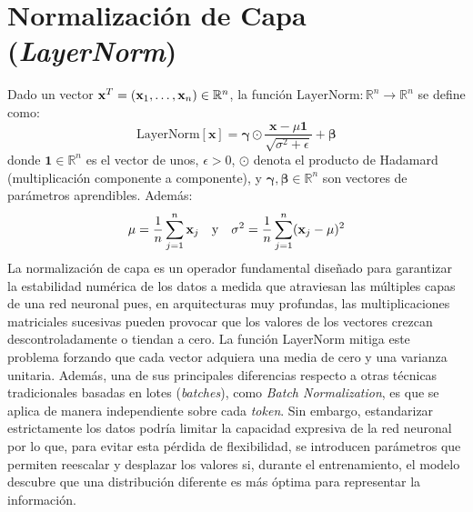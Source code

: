 \section{Normalización de Capa (\textit{LayerNorm})}
Dado un vector $\mathbf{x}^T = (\mathbf{x}_1, \dots, \mathbf{x}_n) \in \mathbb{R}^n$, la función $\text{LayerNorm}: \mathbb{R}^n \to \mathbb{R}^n$ se define como:
\begin{equation}
\text{LayerNorm}[\mathbf{x}] = \boldsymbol{\gamma} \odot \frac{\mathbf{x} - \mu \mathbf{1}}{\sqrt{\sigma^2 + \epsilon}} + \boldsymbol{\beta}
\end{equation}
donde $\mathbf{1} \in \mathbb{R}^n$ es el vector de unos, $\epsilon > 0$, $\odot$ 
denota el producto de Hadamard (multiplicación componente a componente), y 
$\boldsymbol{\gamma}, \boldsymbol{\beta} \in \mathbb{R}^n$ son vectores de parámetros 
aprendibles. Además:
\begin{equation}\mu = \frac{1}{n} \sum_{j=1}^n \mathbf{x}_j \quad \text{y} \quad \sigma^2 = \frac{1}{n} \sum_{j=1}^n (\mathbf{x}_j - \mu)^2
\end{equation}
La normalización de capa es un operador fundamental diseñado para 
garantizar la estabilidad numérica de los datos a medida que atraviesan las múltiples 
capas de una red neuronal pues, en arquitecturas muy profundas, las multiplicaciones matriciales sucesivas pueden provocar que los valores de 
los vectores crezcan descontroladamente o tiendan a cero. La función LayerNorm mitiga este problema forzando que cada vector adquiera una media 
de cero y una varianza unitaria. Además, una de sus principales diferencias respecto a otras técnicas tradicionales basadas en lotes 
(\textit{batches}), como \textit{Batch Normalization}, es que se aplica de manera independiente sobre cada \textit{token}. Sin embargo, estandarizar estrictamente los datos podría limitar la capacidad expresiva de la red neuronal por lo que, para evitar esta pérdida de flexibilidad, se introducen parámetros que permiten reescalar y desplazar los valores si, durante el entrenamiento, el modelo descubre que una distribución diferente es más óptima para representar la información.










 
 
















